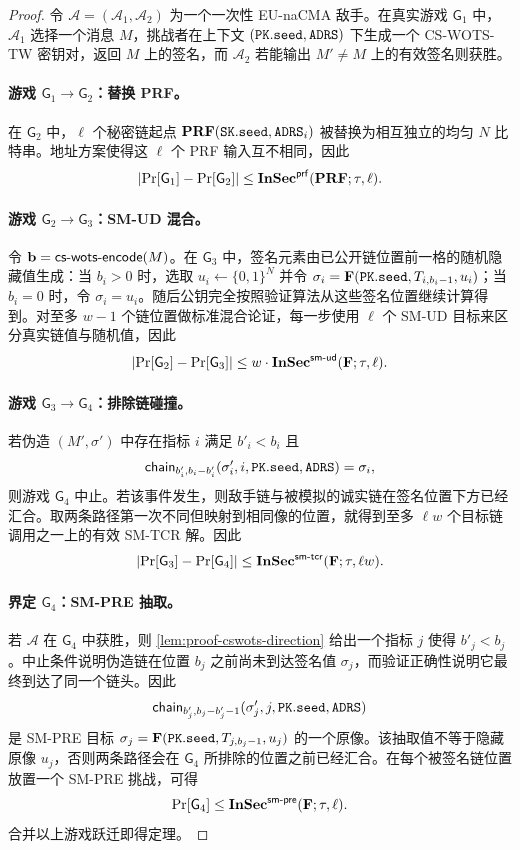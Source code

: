 \begin{proof}
令 $\mathcal{A}=(\mathcal{A}_1,\mathcal{A}_2)$ 为一个一次性 EU-naCMA 敌手。在真实游戏 $\mathsf{G}_1$ 中，$\mathcal{A}_1$ 选择一个消息 $M$，挑战者在上下文 $(\pk.\seed,\ADRS)$ 下生成一个 CS-WOTS-TW 密钥对，返回 $M$ 上的签名，而 $\mathcal{A}_2$ 若能输出 $M'\ne M$ 上的有效签名则获胜。

\paragraph{游戏 $\mathsf{G}_1\to\mathsf{G}_2$：替换 PRF。}
在 $\mathsf{G}_2$ 中，$\ell$ 个秘密链起点 $\PRF(\sk.\seed,\ADRS_i)$ 被替换为相互独立的均匀 $N$ 比特串。地址方案使得这 $\ell$ 个 PRF 输入互不相同，因此
\[
    \left|\Pr[\mathsf{G}_1]-\Pr[\mathsf{G}_2]\right|
    \le \mathbf{InSec}^{\mathsf{prf}}(\mathbf{PRF};\tau,\ell).
\]

\paragraph{游戏 $\mathsf{G}_2\to\mathsf{G}_3$：SM-UD 混合。}
令 $\mathbf{b}=\mathsf{cs\text{-}wots\text{-}encode}(M)$。在 $\mathsf{G}_3$ 中，签名元素由已公开链位置前一格的随机隐藏值生成：当 $b_i>0$ 时，选取 $u_i\leftarrow\{0,1\}^N$ 并令
$\sigma_i=\hashF(\pk.\seed,T_{i,b_i-1},u_i)$；当 $b_i=0$ 时，令
$\sigma_i=u_i$。随后公钥完全按照验证算法从这些签名位置继续计算得到。对至多 $w-1$ 个链位置做标准混合论证，每一步使用 $\ell$ 个 SM-UD 目标来区分真实链值与随机值，因此
\[
    \left|\Pr[\mathsf{G}_2]-\Pr[\mathsf{G}_3]\right|
    \le w\cdot\mathbf{InSec}^{\mathsf{sm\text{-}ud}}(\mathbf{F};\tau,\ell).
\]

\paragraph{游戏 $\mathsf{G}_3\to\mathsf{G}_4$：排除链碰撞。}
若伪造 $(M',\sigma')$ 中存在指标 $i$ 满足 $b'_i<b_i$ 且
\[
    \Chain_{b'_i,b_i-b'_i}(\sigma'_i,i,\pk.\seed,\ADRS)=\sigma_i,
\]
则游戏 $\mathsf{G}_4$ 中止。若该事件发生，则敌手链与被模拟的诚实链在签名位置下方已经汇合。取两条路径第一次不同但映射到相同像的位置，就得到至多 $\ell w$ 个目标链调用之一上的有效 SM-TCR 解。因此
\[
    \left|\Pr[\mathsf{G}_3]-\Pr[\mathsf{G}_4]\right|
    \le \mathbf{InSec}^{\mathsf{sm\text{-}tcr}}(\mathbf{F};\tau,\ell w).
\]

\paragraph{界定 $\mathsf{G}_4$：SM-PRE 抽取。}
若 $\mathcal{A}$ 在 $\mathsf{G}_4$ 中获胜，则 \cref{lem:proof-cswots-direction} 给出一个指标 $j$ 使得 $b'_j<b_j$。中止条件说明伪造链在位置 $b_j$ 之前尚未到达签名值 $\sigma_j$，而验证正确性说明它最终到达了同一个链头。因此
\[
    \Chain_{b'_j,b_j-b'_j-1}(\sigma'_j,j,\pk.\seed,\ADRS)
\]
是 SM-PRE 目标 $\sigma_j=\hashF(\pk.\seed,T_{j,b_j-1},u_j)$ 的一个原像。该抽取值不等于隐藏原像 $u_j$，否则两条路径会在 $\mathsf{G}_4$ 所排除的位置之前已经汇合。在每个被签名链位置放置一个 SM-PRE 挑战，可得
\[
    \Pr[\mathsf{G}_4]\le
    \mathbf{InSec}^{\mathsf{sm\text{-}pre}}(\mathbf{F};\tau,\ell).
\]
合并以上游戏跃迁即得定理。
\end{proof}

